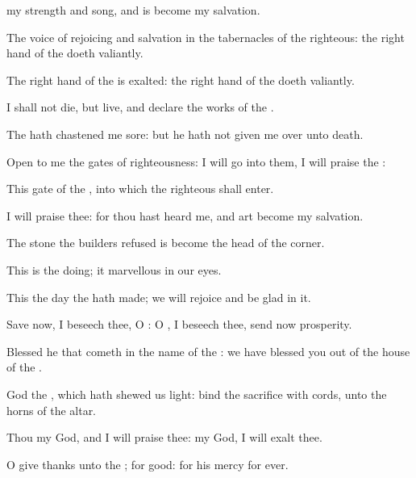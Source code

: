 {{}
{} my
strength and
song, and is become my
salvation.
\par }{\Q {}The
voice of
rejoicing and
salvation
{} in the
tabernacles of the
righteous: the right
hand of the
{}
doeth
valiantly.
\par }{\Q {}The right
hand of the
{} is
exalted: the right
hand of the
{}
doeth
valiantly.
\par }{\Q {}I shall not
die, but
live, and
declare the
works of the
{}.
\par }{\Q {}The
{} hath
chastened me
sore: but he hath not given me
over unto
death.
\par }{\BB \par }{\Q {}Open to me the
gates of
righteousness: I will
go into them,
{} I will
praise the
{}:
\par }{\Q {}This
gate of the
{}, into which the
righteous shall
enter.
\par }{\Q {}I will
praise thee: for thou hast
heard me, and art become my
salvation.
\par }{\Q {}The
stone
{} the
builders
refused is become the
head
{} of the
corner.
\par }{\Q {}This is the
{} doing; it
{}
marvellous in our
eyes.
\par }{\Q {}This
{} the
day
{} the
{} hath
made; we will
rejoice and be
glad in it.
\par }{\Q {}Save now, I
beseech thee, O
{}: O
{}, I
beseech thee, send now
prosperity.
\par }{\Q {}Blessed
{} he that
cometh in the
name of the
{}: we have
blessed you out of the
house of the
{}.
\par }{\Q {}God
{} the
{}, which hath shewed us
light:
bind the
sacrifice with
cords,
{} unto the
horns of the
altar.
\par }{\Q {}Thou
{} my
God, and I will
praise thee:
{} my
God, I will
exalt thee.
\par }{\Q {}O give
thanks unto the
{}; for
{}
good: for his
mercy
{} for
ever.

}
